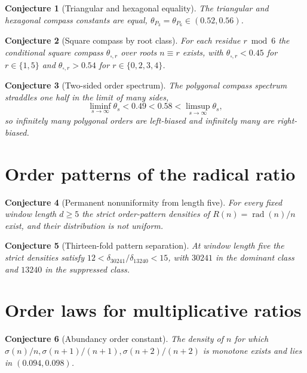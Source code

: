 \documentclass[11pt]{article}
\newtheorem{conjecture}{Conjecture}
\theoremstyle{definition}
\begin{document}
\begin{conjecture}[Triangular and hexagonal equality]\label{w4}
The triangular and hexagonal compass constants are equal, $\theta_{P_3}=\theta_{P_6}\in(0.52,0.56)$.
\end{conjecture}

\begin{conjecture}[Square compass by root class]\label{w5}
For each residue $r\bmod6$ the conditional square compass $\theta_{\square,r}$ over roots $n\equiv r$ exists, with $\theta_{\square,r}<0.45$ for $r\in\{1,5\}$ and $\theta_{\square,r}>0.54$ for $r\in\{0,2,3,4\}$.
\end{conjecture}

\begin{conjecture}[Two-sided order spectrum]\label{w6}
The polygonal compass spectrum straddles one half in the limit of many sides,
\[
\liminf_{s\to\infty}\theta_s<0.49<0.58<\limsup_{s\to\infty}\theta_s,
\]
so infinitely many polygonal orders are left-biased and infinitely many are right-biased.
\end{conjecture}

\section{Order patterns of the radical ratio}

\begin{conjecture}[Permanent nonuniformity from length five]\label{w7}
For every fixed window length $d\ge5$ the strict order-pattern densities of $R(n)=\operatorname{rad}(n)/n$ exist, and their distribution is not uniform.
\end{conjecture}

\begin{conjecture}[Thirteen-fold pattern separation]\label{w8}
At window length five the strict densities satisfy $12<\delta_{30241}/\delta_{13240}<15$, with $30241$ in the dominant class and $13240$ in the suppressed class.
\end{conjecture}

\section{Order laws for multiplicative ratios}

\begin{conjecture}[Abundancy order constant]\label{w9}
The density of $n$ for which $\sigma(n)/n,\sigma(n+1)/(n+1),\sigma(n+2)/(n+2)$ is monotone exists and lies in $(0.094,0.098)$.
\end{conjecture}
\end{document}
